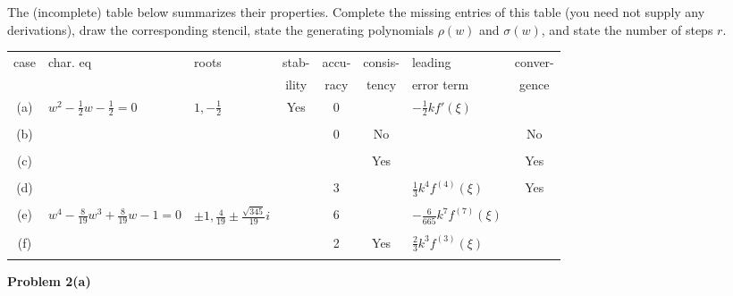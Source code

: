 \documentclass[12pt]{article}
\newcommand{\problem}[1]{\hspace{-4 ex} \large \textbf{Problem #1} }
\begin{document}
The (incomplete) table below summarizes their properties.  Complete the missing
entries of this table (you need not supply any derivations), draw the corresponding
stencil, state the generating polynomials $\rho(w)$ and $\sigma(w)$, and state
the number of steps $r$.
\begin{center}
	\begin{tabular}{|c|l|l|c|c|c|l|c|}
		\hline
		case & char. eq & roots & stab-   & accu- & consis- & leading & conver- \\
		&          &       & ility & racy  & tency   & error term & gence \\
		\hline
		(a)  & $w^2 - \frac{1}{2}w - \frac{1}{2}=0$ & $1,-\frac{1}{2}$ & Yes & 
		0 &  & $-\frac{1}{2}k f'(\xi)$ & \\
		& & & & & & & \\
		(b)  &  & & & 0 & No  & & No \\
		& & & & & & & \\
		(c)  &  &  &  &   & Yes  &  & Yes \\
		& & & & & & & \\
		(d)  &  &  &  & 3 &      & $\frac{1}{3}k^4 f^{(4)}(\xi)$ & Yes \\
		& & & & & & & \\
		(e)  & $w^4 - \frac{8}{19}w^3 + \frac{8}{19}w-1=0$ & $\pm 1,\frac{4}{19}\pm \frac{\sqrt{345}}{19}i$ &  & 
		6 &  & $-\frac{6}{665}k^7 f^{(7)}(\xi)$ & \\
		& & & & & & & \\
		(f)  &  &  &  & 2 & Yes & $\frac{2}{3}k^3 f^{(3)}(\xi)$ & \\
		& & & & & & & \\
		\hline
	\end{tabular}
\end{center}


\bigbreak
\problem{2(a)} 
\end{document}
